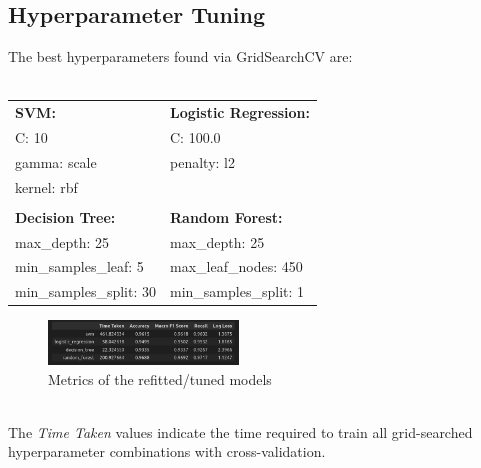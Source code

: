 \subsection{Hyperparameter Tuning}
The best hyperparameters found via GridSearchCV are:\\\\
\begin{tabular}{ll}
\textbf{SVM:} & \textbf{Logistic Regression:} \\
\quad  C: 10 & \quad  C: 100.0 \\
\quad  gamma: scale & \quad penalty: l2 \\
\quad  kernel: rbf & \\
& \\
\textbf{Decision Tree:} & \textbf{ Random Forest:} \\
\quad  max\_depth: 25 & \quad  max\_depth: 25 \\
\quad  min\_samples\_leaf: 5 & \quad  max\_leaf\_nodes: 450 \\
\quad  min\_samples\_split: 30 & \quad  min\_samples\_split: 1 \\
\end{tabular}
\begin{figure}[ht!]
    \centering
    \includegraphics[width = 0.45\textwidth]{./images/gridsearchcv.png}
    \caption{Metrics of the refitted/tuned models}
    \label{fig:5}
\end{figure}\\
The \textit{Time Taken} values indicate the time required to train all grid-searched hyperparameter combinations with cross-validation.
